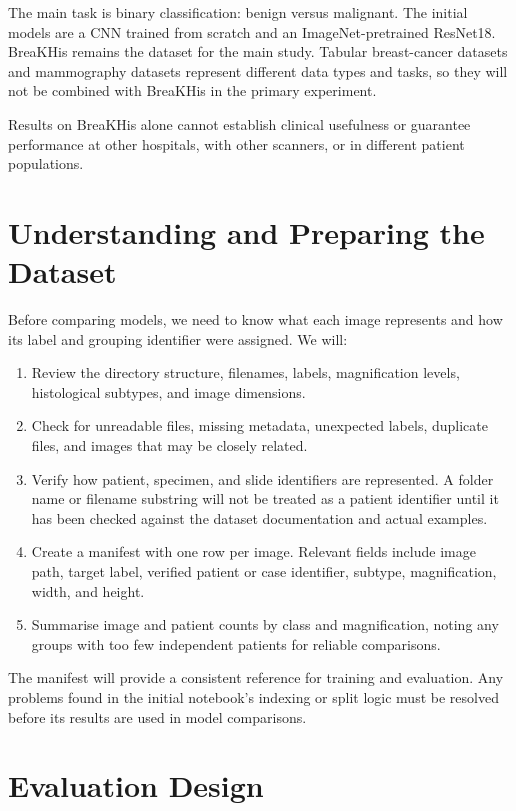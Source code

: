 \documentclass[11pt,a4paper]{article}
\begin{document}
The main task is binary classification: benign versus malignant. The initial models are a CNN trained from scratch and an ImageNet-pretrained ResNet18. BreaKHis remains the dataset for the main study. Tabular breast-cancer datasets and mammography datasets represent different data types and tasks, so they will not be combined with BreaKHis in the primary experiment.

Results on BreaKHis alone cannot establish clinical usefulness or guarantee performance at other hospitals, with other scanners, or in different patient populations.

\section{Understanding and Preparing the Dataset}

Before comparing models, we need to know what each image represents and how its label and grouping identifier were assigned. We will:
\begin{enumerate}
    \item Review the directory structure, filenames, labels, magnification levels, histological subtypes, and image dimensions.
    \item Check for unreadable files, missing metadata, unexpected labels, duplicate files, and images that may be closely related.
    \item Verify how patient, specimen, and slide identifiers are represented. A folder name or filename substring will not be treated as a patient identifier until it has been checked against the dataset documentation and actual examples.
    \item Create a manifest with one row per image. Relevant fields include image path, target label, verified patient or case identifier, subtype, magnification, width, and height.
    \item Summarise image and patient counts by class and magnification, noting any groups with too few independent patients for reliable comparisons.
\end{enumerate}

The manifest will provide a consistent reference for training and evaluation. Any problems found in the initial notebook's indexing or split logic must be resolved before its results are used in model comparisons.

\section{Evaluation Design}
\end{document}
